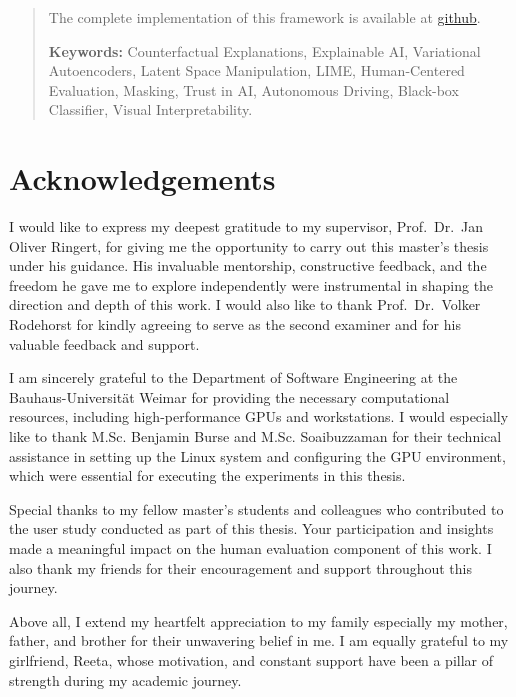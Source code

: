 \begin{abstract}
The complete implementation of this framework is available at \href{https://github.com/darshandodamani/A-Counterfactual-Explanation-Approach-Using-Deep-Generative-Models} {github}.

\textbf{Keywords:}
Counterfactual Explanations, Explainable AI, Variational Autoencoders, Latent Space Manipulation, LIME, Human-Centered Evaluation, Masking, Trust in AI, Autonomous Driving, Black-box Classifier, Visual Interpretability.
\end{abstract}

\clearpage
\thispagestyle{empty}
\null
\clearpage

\chapter*{Acknowledgements}

I would like to express my deepest gratitude to my supervisor, Prof.\ Dr.\ Jan Oliver Ringert, for giving me the opportunity to carry out this master's thesis under his guidance. His invaluable mentorship, constructive feedback, and the freedom he gave me to explore independently were instrumental in shaping the direction and depth of this work. I would also like to thank Prof.\ Dr.\ Volker Rodehorst for kindly agreeing to serve as the second examiner and for his valuable feedback and support.

I am sincerely grateful to the Department of Software Engineering at the Bauhaus-Universität Weimar for providing the necessary computational resources, including high-performance GPUs and workstations. I would especially like to thank M.Sc. Benjamin Burse and M.Sc. Soaibuzzaman for their technical assistance in setting up the Linux system and configuring the GPU environment, which were essential for executing the experiments in this thesis.

Special thanks to my fellow master's students and colleagues who contributed to the user study conducted as part of this thesis. Your participation and insights made a meaningful impact on the human evaluation component of this work. I also thank my friends for their encouragement and support throughout this journey.

Above all, I extend my heartfelt appreciation to my family especially my mother, father, and brother for their unwavering belief in me. I am equally grateful to my girlfriend, Reeta, whose motivation, and constant support have been a pillar of strength during my academic journey.

